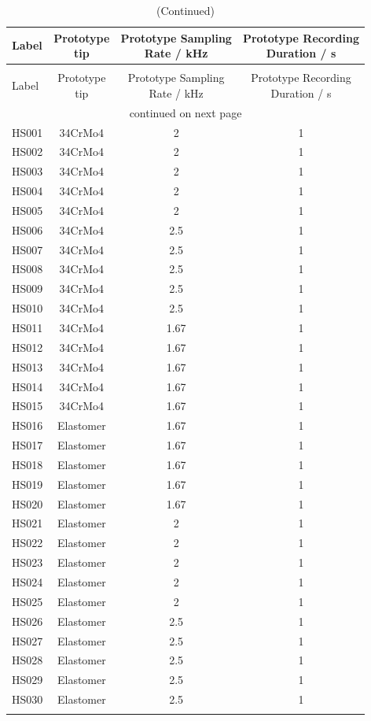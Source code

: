 {\scriptsize%
\begin{longtable}{lccc}
\caption[Hammer-Surface Measurements]{Hammer-surface measurements}\\
\toprule
Label & \makecell{Prototype\\tip} & \makecell{Prototype Sampling\\Rate / \si{\kilo\hertz}} & \makecell{Prototype Recording\\Duration / \si{\second}}\\
\midrule
\endfirsthead
\caption[]{(Continued)}\\
\toprule
Label & \makecell{Prototype\\tip} & \makecell{Prototype Sampling\\Rate / \si{\kilo\hertz}} & \makecell{Prototype Recording\\Duration / \si{\second}}\\
\midrule
\endhead
\midrule
\multicolumn{4}{c}{continued on next page}\\
\bottomrule
\endfoot
\endlastfoot
\hline
	HS001 & 34CrMo4 & 2 & 1\\
	HS002 & 34CrMo4 & 2 & 1\\
	HS003 & 34CrMo4 & 2 & 1\\
	HS004 & 34CrMo4 & 2 & 1\\
	HS005 & 34CrMo4 & 2 & 1\\
	HS006 & 34CrMo4 & 2.5 & 1\\
	HS007 & 34CrMo4 & 2.5 & 1\\
	HS008 & 34CrMo4 & 2.5 & 1\\
	HS009 & 34CrMo4 & 2.5 & 1\\
	HS010 & 34CrMo4 & 2.5 & 1\\
	HS011 & 34CrMo4 & 1.67 & 1\\
	HS012 & 34CrMo4 & 1.67 & 1\\
	HS013 & 34CrMo4 & 1.67 & 1\\
	HS014 & 34CrMo4 & 1.67 & 1\\
	HS015 & 34CrMo4 & 1.67 & 1\\
	HS016 & Elastomer & 1.67 & 1\\
	HS017 & Elastomer & 1.67 & 1\\
	HS018 & Elastomer & 1.67 & 1\\
	HS019 & Elastomer & 1.67 & 1\\
	HS020 & Elastomer & 1.67 & 1\\
	HS021 & Elastomer & 2 & 1\\
	HS022 & Elastomer & 2 & 1\\
	HS023 & Elastomer & 2 & 1\\
	HS024 & Elastomer & 2 & 1\\
	HS025 & Elastomer & 2 & 1\\
	HS026 & Elastomer & 2.5 & 1\\
	HS027 & Elastomer & 2.5 & 1\\
	HS028 & Elastomer & 2.5 & 1\\
	HS029 & Elastomer & 2.5 & 1\\
	HS030 & Elastomer & 2.5 & 1\\
\bottomrule
\label{tab:hs_tests}
\end{longtable}
}


